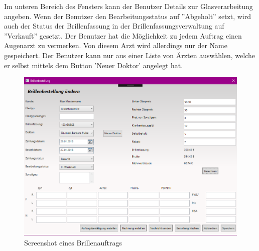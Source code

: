 Im unteren Bereich des Fensters kann der Benutzer Details zur Glasverarbeitung angeben. Wenn der Benutzer den Bearbeitungsstatus auf ''Abgeholt'' setzt, wird auch der Status der Brillenfassung in der Brillenfassungsverwaltung auf ''Verkauft'' gesetzt. \newline Der Benutzer hat die Möglichkeit zu jedem Auftrag einen Augenarzt zu vermerken. Von diesem Arzt wird allerdings nur der Name gespeichert. Der Benutzer kann nur aus einer Liste von Ärzten auswählen, welche er  selbst mittels dem Button 'Neuer Doktor' angelegt hat.
\begin{figure}[H]
\begin{center}
	\includegraphics[scale=.6]{images/Brillenauftrag.png}
\end{center}
	\caption{Screenshot eines Brillenauftrags}
	\label{fig:sample}
\end{figure}

